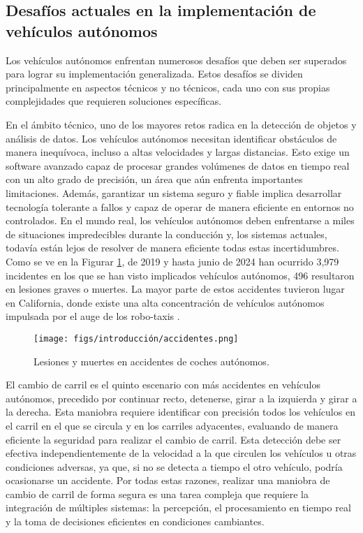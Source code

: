 \subsection{Desafíos actuales en la implementación de vehículos autónomos}
\label{sec:desafíos}

Los vehículos autónomos enfrentan numerosos desafíos que deben ser superados para lograr su implementación generalizada. Estos desafíos se dividen principalmente en aspectos técnicos y no técnicos, cada uno con sus propias complejidades que requieren soluciones específicas.

En el ámbito técnico, uno de los mayores retos radica en la detección de objetos y análisis de datos. Los vehículos autónomos necesitan identificar obstáculos de manera inequívoca, incluso a altas velocidades y largas distancias. Esto exige un software avanzado capaz de procesar grandes volúmenes de datos en tiempo real con un alto grado de precisión, un área que aún enfrenta importantes limitaciones. Además, garantizar un sistema seguro y fiable implica desarrollar tecnología tolerante a fallos y capaz de operar de manera eficiente en entornos no controlados. En el mundo real, los vehículos autónomos deben enfrentarse a miles de situaciones impredecibles durante la conducción y, los sistemas actuales, todavía están lejos de resolver de manera eficiente todas estas incertidumbres. Como se ve en la Figurar \ref{fig:accidentes}, de 2019 y hasta junio de 2024 han ocurrido 3,979 incidentes en los que se han visto implicados vehículos autónomos, 496 resultaron en lesiones graves o muertes. La mayor parte de estos accidentes tuvieron lugar en California, donde existe una alta concentración de vehículos autónomos impulsada por el auge de los robo-taxis \cite{accidentes}.

\begin{figure}[ht]
\begin{center}
\texttt{[image: figs/introducción/accidentes.png]}
\end{center}
\caption{Lesiones y muertes en accidentes de coches autónomos.}
\label{fig:accidentes}
\end{figure}

El cambio de carril es el quinto escenario con más accidentes en vehículos autónomos, precedido por continuar recto, detenerse, girar a la izquierda y girar a la derecha. Esta maniobra requiere identificar con precisión todos los vehículos en el carril en el que se circula y en los carriles adyacentes, evaluando de manera eficiente la seguridad para realizar el cambio de carril. Esta detección debe ser efectiva independientemente de la velocidad a la que circulen los vehículos u otras condiciones adversas, ya que, si no se detecta a tiempo el otro vehículo, podría ocasionarse un accidente. Por todas estas razones, realizar una maniobra de cambio de carril de forma segura es una tarea compleja que requiere la integración de múltiples sistemas: la percepción, el procesamiento en tiempo real y la toma de decisiones eficientes en condiciones cambiantes.

